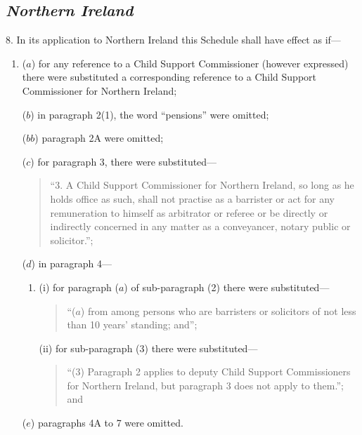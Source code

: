 \documentclass[12pt,a4paper]{article}
\begin{document}

\subsection*{\itshape Northern Ireland}

8. In its application to Northern Ireland this Schedule shall have effect as if—
\begin{enumerate}\item[]
($a$) for any reference to a Child Support Commissioner (however expressed) there were substituted a corresponding reference to a Child Support Commissioner for Northern Ireland;

($b$) in paragraph 2(1), the word “pensions” were omitted;

($bb$) paragraph 2A were omitted;

($c$) for paragraph 3, there were substituted—
\begin{quotation}
“3. A Child Support Commissioner for Northern Ireland, so long as he holds office as such, shall not practise as a barrister or act for any remuneration to himself as arbitrator or referee or be directly or indirectly concerned in any matter as a conveyancer, notary public or solicitor.”;
\end{quotation}

($d$) in paragraph 4—
\begin{enumerate}\item[]
(i) for paragraph ($a$)  of sub-paragraph (2)  there were substituted—
\begin{quotation}
“($a$) from among persons who are barristers or solicitors of not less than 10 years' standing; and”;
\end{quotation}

(ii) for sub-paragraph (3)  there were substituted—
\begin{quotation}
“(3) Paragraph 2 applies to deputy Child Support Commissioners for Northern Ireland, but paragraph 3 does not apply to them.”; and
\end{quotation}
\end{enumerate}

($e$) 
paragraphs 4A  %
to 7 were omitted.
\end{enumerate}
\end{document}
